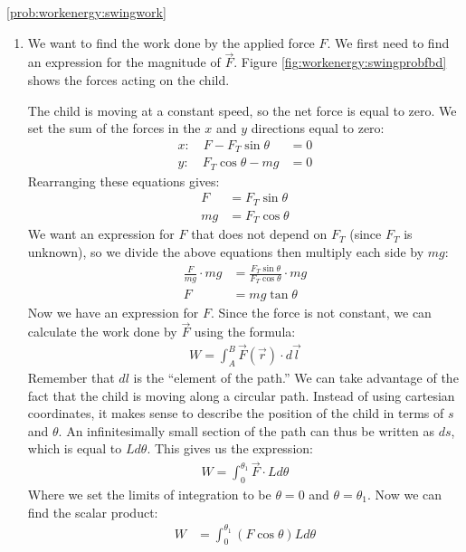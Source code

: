 \begin{solution}{\ref{prob:workenergy:swingwork}}
\begin{enumerate}[label=\alph*)]
\item We want to find the work done by the applied force $F$. We first need to find an expression for the magnitude of $\vec F$. Figure \ref{fig:workenergy:swingprobfbd} shows the forces acting on the child. 

The child is moving at a constant speed, so the net force is equal to zero. We set the sum of the forces in the $x$ and $y$ directions equal to zero:
\begin{align*}
x: \quad F-F_T\sin\theta &=0\\
y: \quad F_T\cos\theta -mg &= 0
\end{align*} 
Rearranging these equations gives:
\begin{align*}
F&=F_T\sin\theta\\
mg&=F_T\cos\theta
\end{align*}
We want an expression for $F$ that does not depend on $F_T$ (since $F_T$ is unknown), so we divide the above equations then multiply each side by $mg$:
\begin{align*}
\frac{F}{mg}\cdot mg &= \frac{F_T\sin\theta}{F_T\cos\theta}\cdot mg\\
F&=mg\tan\theta
\end{align*}
Now we have an expression for $F$. Since the force is not constant, we can calculate the work done by $\vec F$ using the formula:
\begin{align*}
W=\int_A^B\vec F(\vec r) \cdot d\vec l
\end{align*} 
Remember that $dl$ is the ``element of the path.'' We can take advantage of the fact that the child is moving along a circular path. Instead of using cartesian coordinates, it makes sense to describe the position of the child in terms of $s$ and $\theta$. An infinitesimally small section of the path can thus be written as $ds$, which is equal to $Ld\theta$. This gives us the expression:
\begin{align*}
W=\int_0^{\theta_1}\vec F \cdot Ld\theta
\end{align*}
Where we set the limits of integration to be $\theta=0$ and $\theta=\theta_1$. Now we can find the scalar product:
\begin{align*}
W&=\int_0^{\theta_1}(F\cos\theta)Ld\theta\\

\end{align*}
\end{enumerate}
\end{solution}
